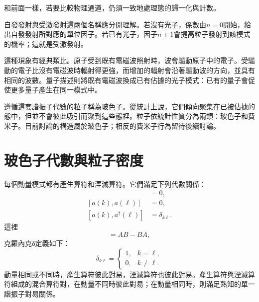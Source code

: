 \begin{classroomqa}
\end{classroomqa}

和前面一樣，若要比較物理通道，仍須一致地處理態的歸一化與計數。

\begin{classroomqa}
\end{classroomqa}

自發發射與受激發射這兩個名稱應分開理解。若沒有光子，係數由\(n=0\)開始，給出自發發射所對應的單位因子。若已有光子，因子\(n+1\)會提高粒子發射到該模式的機率；這就是受激發射。

這種現象有經典類比。原子受到既有電磁波照射時，波會驅動原子中的電子。受驅動的電子比沒有電磁波時輻射得更強，而增加的輻射會沿著驅動波的方向，並具有相同的波數。量子描述則將既有電磁波換成已有佔據的光子模式：已有的量子會促使更多量子產生在同一模式中。

遵循這套諧振子代數的粒子稱為玻色子。從統計上說，它們傾向聚集在已被佔據的態中，但並不會彼此吸引而聚到這些態裡。粒子依統計性質分為兩類：玻色子和費米子。目前討論的構造屬於玻色子；相反的費米子行為留待後續討論。

\section{玻色子代數與粒子密度}

每個動量模式都有產生算符和湮滅算符。它們滿足下列代數關係：
\begin{align}
[a^\dagger(k),a^\dagger(\ell)]&=0,\\
[a(k),a(\ell)]&=0,\\
[a(k),a^\dagger(\ell)]&=\delta_{k\ell}.
\end{align}
這裡
\begin{equation}
[A,B]=AB-BA,
\end{equation}
克羅內克{\proseunicodefont δ}定義如下：
\begin{equation}
\delta_{k\ell}=
\begin{cases}
1,&k=\ell,\\
0,&k\ne\ell.
\end{cases}
\end{equation}
動量相同或不同時，產生算符彼此對易，湮滅算符也彼此對易。產生算符與湮滅算符組成的混合算符對，在動量不同時彼此對易；在動量相同時，則滿足熟知的單一諧振子對易關係。

